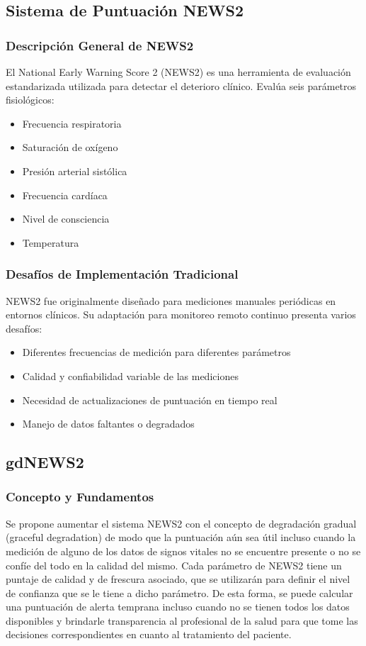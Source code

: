 \subsection{Sistema de Puntuación NEWS2}

\subsubsection{Descripción General de NEWS2}
El National Early Warning Score 2 (NEWS2) es una herramienta de evaluación estandarizada utilizada para detectar el deterioro clínico. Evalúa seis parámetros fisiológicos:
\begin{itemize}
    \item Frecuencia respiratoria
    \item Saturación de oxígeno
    \item Presión arterial sistólica
    \item Frecuencia cardíaca
    \item Nivel de consciencia
    \item Temperatura
\end{itemize}

\subsubsection{Desafíos de Implementación Tradicional}
NEWS2 fue originalmente diseñado para mediciones manuales periódicas en entornos clínicos. Su adaptación para monitoreo remoto continuo presenta varios desafíos:
\begin{itemize}
    \item Diferentes frecuencias de medición para diferentes parámetros
    \item Calidad y confiabilidad variable de las mediciones
    \item Necesidad de actualizaciones de puntuación en tiempo real
    \item Manejo de datos faltantes o degradados
\end{itemize}

\subsection{gdNEWS2}

\subsubsection{Concepto y Fundamentos}
Se propone aumentar el sistema NEWS2 con el concepto de degradación gradual (graceful degradation) de modo que la puntuación aún sea útil incluso cuando la medición de alguno de los datos de signos vitales no 
se encuentre presente o no se confíe del todo en la calidad del mismo.
Cada parámetro de NEWS2 tiene un puntaje de calidad y de frescura asociado, que se utilizarán para definir el nivel de confianza que se le tiene a dicho parámetro.
De esta forma, se puede calcular una puntuación de alerta temprana incluso cuando no se tienen todos los datos disponibles 
y brindarle transparencia al profesional de la salud para que tome las decisiones correspondientes en cuanto al tratamiento del paciente.

